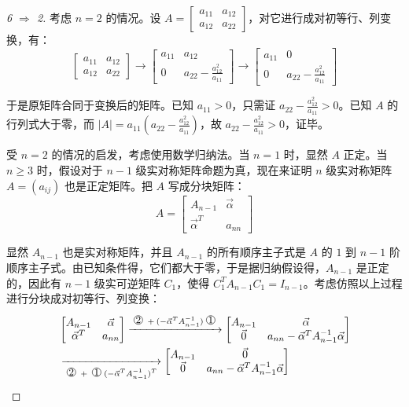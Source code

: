 \begin{proof}[6 $\Longrightarrow$ 2]
	考虑 $n = 2$ 的情况。设 $A = \begin{bmatrix} a_{11} & a_{12} \\ a_{12} & a_{22} \end{bmatrix}$，对它进行成对初等行、列变换，有：
	$$
	\begin{bmatrix} a_{11} & a_{12} \\ a_{12} & a_{22} \end{bmatrix}
	\rightarrow
	\begin{bmatrix} a_{11} & a_{12} \\ 0 & a_{22} - \frac{a_{12}^2}{a_{11}} \end{bmatrix}
	\rightarrow
	\begin{bmatrix} a_{11} & 0 \\ 0 & a_{22} - \frac{a_{12}^2}{a_{11}} \end{bmatrix}
	$$

	于是原矩阵合同于变换后的矩阵。已知 $a_{11} > 0$，只需证 $a_{22} - \frac{a_{12}^2}{a_{11}} > 0$。已知 $A$ 的行列式大于零，而 $|A| = a_{11} (a_{22} - \frac{a_{12}^2}{a_{11}})$，故 $a_{22} - \frac{a_{12}^2}{a_{11}} > 0$，证毕。

	受 $n = 2$ 的情况的启发，考虑使用数学归纳法。当 $n = 1$ 时，显然 $A$ 正定。当 $n \ge 3$ 时，假设对于 $n - 1$ 级实对称矩阵命题为真，现在来证明 $n$ 级实对称矩阵 $A = (a_{ij})$ 也是正定矩阵。把 $A$ 写成分块矩阵：
	$$
	A =
	\begin{bmatrix} A_{n - 1} & \vec \alpha \\ \vec \alpha^T & a_{nn} \end{bmatrix}
	$$

	显然 $A_{n - 1}$ 也是实对称矩阵，并且 $A_{n - 1}$ 的所有顺序主子式是 $A$ 的 $1$ 到 $n - 1$ 阶顺序主子式。由已知条件得，它们都大于零，于是据归纳假设得，$A_{n - 1}$ 是正定的，因此有 $n - 1$ 级实可逆矩阵 $C_1$，使得 $C_1^T A_{n - 1} C_1 = I_{n - 1}$。考虑仿照以上过程进行分块成对初等行、列变换：
	$$
	\begin{aligned}&
		\begin{bmatrix} A_{n - 1} & \vec \alpha \\ \vec \alpha^T & a_{nn} \end{bmatrix}
		\xrightarrow{\text{$\circled 2 + (-\vec \alpha^T A_{n - 1}^{-1}) \circled 1$}}
		\begin{bmatrix} A_{n - 1} & \vec \alpha \\ \vec 0 & a_{nn} - \vec \alpha^T A_{n - 1}^{-1} \vec \alpha \end{bmatrix}
		\\&
		\xrightarrow[\text{$\circled 2 + \circled 1 (-\vec \alpha^T A_{n - 1}^{-1})^T$}]{}
		\begin{bmatrix} A_{n - 1} & \vec 0 \\ \vec 0 & a_{nn} - \vec \alpha^T A_{n - 1}^{-1} \vec \alpha \end{bmatrix}
	\end{aligned}
	$$


\end{proof}
